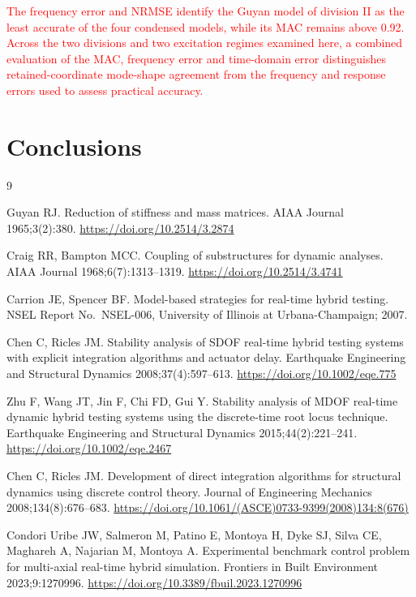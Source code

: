 \documentclass[11pt,a4paper]{article}
\numberwithin{equation}{section}
\newcommand{\rev}[1]{\textcolor{red}{#1}}
\begin{document}
\rev{The frequency error and NRMSE identify the Guyan model of division II as the least accurate of the four condensed models, while its MAC remains above 0.92. Across the two divisions and two excitation regimes examined here, a combined evaluation of the MAC, frequency error and time-domain error distinguishes retained-coordinate mode-shape agreement from the frequency and response errors used to assess practical accuracy.}




\section{Conclusions} \label{sec6}



\begin{thebibliography}{9}
	
	Guyan RJ. Reduction of stiffness and mass matrices. AIAA Journal 1965;3(2):380. \url{https://doi.org/10.2514/3.2874}
	
	Craig RR, Bampton MCC. Coupling of substructures for dynamic analyses. AIAA Journal 1968;6(7):1313--1319. \url{https://doi.org/10.2514/3.4741}
	
	Carrion JE, Spencer BF. Model-based strategies for real-time hybrid testing. NSEL Report No.\ NSEL-006, University of Illinois at Urbana-Champaign; 2007.
	
	Chen C, Ricles JM. Stability analysis of SDOF real-time hybrid testing systems with explicit integration algorithms and actuator delay. Earthquake Engineering and Structural Dynamics 2008;37(4):597--613. \url{https://doi.org/10.1002/eqe.775}
	
	Zhu F, Wang JT, Jin F, Chi FD, Gui Y. Stability analysis of MDOF real-time dynamic hybrid testing systems using the discrete-time root locus technique. Earthquake Engineering and Structural Dynamics 2015;44(2):221--241. \url{https://doi.org/10.1002/eqe.2467}
	
	Chen C, Ricles JM. Development of direct integration algorithms for structural dynamics using discrete control theory. Journal of Engineering Mechanics 2008;134(8):676--683. \url{https://doi.org/10.1061/(ASCE)0733-9399(2008)134:8(676)}
	
	Condori Uribe JW, Salmeron M, Patino E, Montoya H, Dyke SJ, Silva CE, Maghareh A, Najarian M, Montoya A. Experimental benchmark control problem for multi-axial real-time hybrid simulation. Frontiers in Built Environment 2023;9:1270996. \url{https://doi.org/10.3389/fbuil.2023.1270996}
	

\end{thebibliography}
\end{document}
